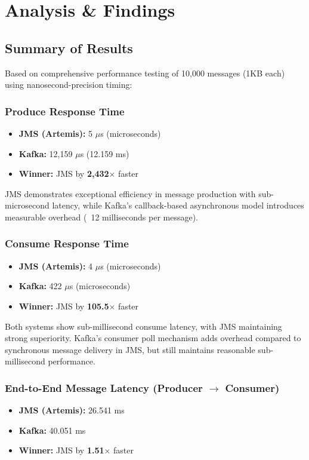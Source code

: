 \documentclass[11pt,a4paper]{article}
\begin{document}
\newpage
\section{Analysis \& Findings}

\subsection{Summary of Results}

Based on comprehensive performance testing of 10,000 messages (1KB each) using
nanosecond-precision timing:

\subsubsection{Produce Response Time}
\begin{itemize}[leftmargin=*,nosep]
    \item \textbf{JMS (Artemis):} 5 $\mu$s (microseconds)
    \item \textbf{Kafka:} 12,159 $\mu$s (12.159 ms)
    \item \textbf{Winner:} JMS by \textbf{2,432$\times$} faster
\end{itemize}

JMS demonstrates exceptional efficiency in message production with sub-microsecond
latency, while Kafka's callback-based asynchronous model introduces measurable
overhead (~12 milliseconds per message).

\subsubsection{Consume Response Time}
\begin{itemize}[leftmargin=*,nosep]
    \item \textbf{JMS (Artemis):} 4 $\mu$s (microseconds)
    \item \textbf{Kafka:} 422 $\mu$s (microseconds)
    \item \textbf{Winner:} JMS by \textbf{105.5$\times$} faster
\end{itemize}

Both systems show sub-millisecond consume latency, with JMS maintaining strong
superiority. Kafka's consumer poll mechanism adds overhead compared to synchronous
message delivery in JMS, but still maintains reasonable sub-millisecond performance.

\subsubsection{End-to-End Message Latency (Producer $\rightarrow$ Consumer)}
\begin{itemize}[leftmargin=*,nosep]
    \item \textbf{JMS (Artemis):} 26.541 ms
    \item \textbf{Kafka:} 40.051 ms
    \item \textbf{Winner:} JMS by \textbf{1.51$\times$} faster
\end{itemize}
\end{document}
